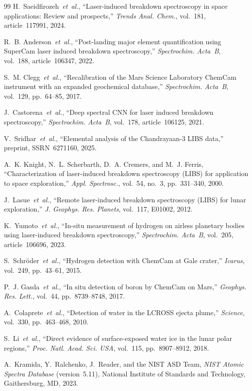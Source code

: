\documentclass[a4paper,twocolumn,10pt]{article}
\begin{document}
\begin{thebibliography}{99}
H.~Saeidfirozeh~\emph{et~al.},
``Laser-induced breakdown spectroscopy in space applications:
Review and prospects,''
\textit{Trends Anal. Chem.}, vol.~181, article~117991, 2024.

R.~B. Anderson~\emph{et~al.},
``Post-landing major element quantification using SuperCam laser
induced breakdown spectroscopy,''
\textit{Spectrochim. Acta~B}, vol.~188, article~106347, 2022.

S.~M. Clegg~\emph{et~al.},
``Recalibration of the Mars Science Laboratory ChemCam instrument
with an expanded geochemical database,''
\textit{Spectrochim. Acta~B}, vol.~129, pp.~64--85, 2017.

J.~Castorena~\emph{et~al.},
``Deep spectral CNN for laser induced breakdown spectroscopy,''
\textit{Spectrochim. Acta~B}, vol.~178, article~106125, 2021.

V.~Sridhar~\emph{et~al.},
``Elemental analysis of the Chandrayaan-3 LIBS data,''
preprint, SSRN~6271160, 2025.

A.~K. Knight, N.~L. Scherbarth, D.~A. Cremers, and M.~J. Ferris,
``Characterization of laser-induced breakdown spectroscopy (LIBS)
for application to space exploration,''
\textit{Appl. Spectrosc.}, vol.~54, no.~3, pp.~331--340, 2000.

J.~Lasue~\emph{et~al.},
``Remote laser-induced breakdown spectroscopy (LIBS) for lunar
exploration,''
\textit{J. Geophys. Res. Planets}, vol.~117, E01002, 2012.

K.~Yumoto~\emph{et~al.},
``In-situ measurement of hydrogen on airless planetary bodies using
laser-induced breakdown spectroscopy,''
\textit{Spectrochim. Acta~B}, vol.~205, article~106696, 2023.

S.~Schr\"oder~\emph{et~al.},
``Hydrogen detection with ChemCam at Gale crater,''
\textit{Icarus}, vol.~249, pp.~43--61, 2015.

P.~J. Gasda~\emph{et~al.},
``In situ detection of boron by ChemCam on Mars,''
\textit{Geophys. Res. Lett.}, vol.~44, pp.~8739--8748, 2017.

A.~Colaprete~\emph{et~al.},
``Detection of water in the LCROSS ejecta plume,''
\textit{Science}, vol.~330, pp.~463--468, 2010.

S.~Li~\emph{et~al.},
``Direct evidence of surface-exposed water ice in the lunar polar
regions,''
\textit{Proc. Natl. Acad. Sci. USA}, vol.~115, pp.~8907--8912, 2018.

A.~Kramida, Y.~Ralchenko, J.~Reader, and the NIST ASD Team,
\textit{NIST Atomic Spectra Database} (version~5.11),
National Institute of Standards and Technology, Gaithersburg, MD,
2023.

\end{thebibliography}
\end{document}
